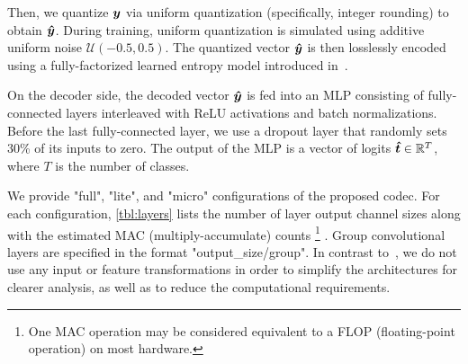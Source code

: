 Then, we quantize ${\boldsymbol{y}}$ via uniform quantization (specifically, integer rounding) to obtain ${\boldsymbol{\hat{y}}}$.
During training, uniform quantization is simulated using additive uniform noise $\mathcal{U}(-0.5, 0.5)$.
The quantized vector ${\boldsymbol{\hat{y}}}$ is then losslessly encoded using a fully-factorized learned entropy model introduced in~\cite{balle2018variational}.

On the decoder side, the decoded vector ${\boldsymbol{\hat{y}}}$ is fed into an MLP consisting of fully-connected layers interleaved with ReLU activations and batch normalizations.
Before the last fully-connected layer, we use a dropout layer that randomly sets 30\% of its inputs to zero.
The output of the MLP is a vector of logits ${\boldsymbol{\hat{t}}} \in \mathbb{R}^T$, where $T$ is the number of classes.

We provide "full", "lite", and "micro" configurations of the proposed codec.
For each configuration, \cref{tbl:layers} lists the number of layer output channel sizes along with the estimated MAC (multiply-accumulate) counts%
\footnote{One MAC operation may be considered equivalent to a FLOP (floating-point operation) on most hardware.}%
.
Group convolutional layers are specified in the format "output\_size/group".
In contrast to~\cite{qi2016pointnet}, we do not use any input or feature transformations in order to simplify the architectures for clearer analysis, as well as to reduce the computational requirements.

%
%


